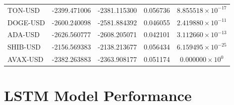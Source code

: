 \begin{table}[h]
\begin{tabular}{|l|c|c|c|c|}
TON-USD & -2399.471006 & -2381.115300 & 0.056736 & $8.855518 \times 10^{-17}$ \\
DOGE-USD & -2600.240098 & -2581.884392 & 0.046055 & $2.419880 \times 10^{-11}$ \\
ADA-USD & -2626.560777 & -2608.205071 & 0.042101 & $3.112660 \times 10^{-13}$ \\
SHIB-USD & -2156.569383 & -2138.213677 & 0.056434 & $6.159495 \times 10^{-25}$ \\
AVAX-USD & -2382.263883 & -2363.908177 & 0.051174 & $0.000000 \times 10^{0}$ \\
\hline
\end{tabular}
\end{table}

\pagebreak
\setcounter{section}{2}
\section{LSTM Model Performance}\label{appendix:lstm_model_performance}

